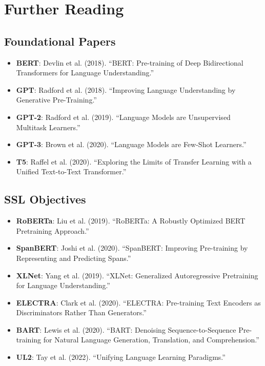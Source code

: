 \documentclass{article}
\begin{document}
\section{Further Reading}

\subsection{Foundational Papers}

\begin{itemize}
\item \textbf{BERT}: Devlin et al. (2018). ``BERT: Pre-training of Deep Bidirectional Transformers for Language Understanding.''

\item \textbf{GPT}: Radford et al. (2018). ``Improving Language Understanding by Generative Pre-Training.''

\item \textbf{GPT-2}: Radford et al. (2019). ``Language Models are Unsupervised Multitask Learners.''

\item \textbf{GPT-3}: Brown et al. (2020). ``Language Models are Few-Shot Learners.''

\item \textbf{T5}: Raffel et al. (2020). ``Exploring the Limits of Transfer Learning with a Unified Text-to-Text Transformer.''
\end{itemize}

\subsection{SSL Objectives}

\begin{itemize}
\item \textbf{RoBERTa}: Liu et al. (2019). ``RoBERTa: A Robustly Optimized BERT Pretraining Approach.''

\item \textbf{SpanBERT}: Joshi et al. (2020). ``SpanBERT: Improving Pre-training by Representing and Predicting Spans.''

\item \textbf{XLNet}: Yang et al. (2019). ``XLNet: Generalized Autoregressive Pretraining for Language Understanding.''

\item \textbf{ELECTRA}: Clark et al. (2020). ``ELECTRA: Pre-training Text Encoders as Discriminators Rather Than Generators.''

\item \textbf{BART}: Lewis et al. (2020). ``BART: Denoising Sequence-to-Sequence Pre-training for Natural Language Generation, Translation, and Comprehension.''

\item \textbf{UL2}: Tay et al. (2022). ``Unifying Language Learning Paradigms.''
\end{itemize}
\end{document}

